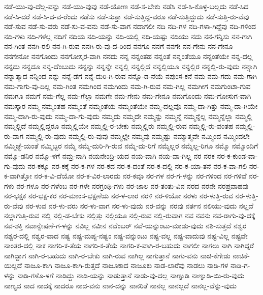 {ನಡೆ-ಯು-ವು-ದೆಲ್ಲ-ವನ್ನು
ನಡೆ-ಯು-ವುವು
ನಡೆ-ಯೋಣ
ನಡೆ-ಸ-ಬೇಕು
ನಡೆಸಿ
ನಡೆ-ಸಿ-ಕೊಳ್ಳ-ಬಲ್ಲದು
ನಡೆ-ಸಿದ
ನಡೆ-ಸಿ-ದರೆ
ನಡೆ-ಸಿ-ದ-ವ-ರೆಂದು
ನಡೆಸು
ನಡೆ-ಸುತ್ತಾ
ನಡೆ-ಸುತ್ತಿದ್ದ-ವರೂ
ನಡೆ-ಸುತ್ತಿದ್ದುದು
ನಡೆ-ಸುತ್ತಿ-ರು-ವೆವು
ನಡೆ-ಸುವ
ನಡೆ-ಸು-ವರು
ನಡೆ-ಸು-ವ-ವನು
ನಡೆ-ಸು-ವಾಗ
ನದಾಗಲೀ
ನದಿ
ನದಿ-ಗಳ
ನದಿ-ಗಳಾ-ಗಿದ್ದೆವು
ನದಿ-ಗಳಿಂದ
ನದಿ-ಗಳು
ನದಿ-ಗಳೆಲ್ಲ
ನದಿಗೆ
ನದಿಯ
ನದಿ-ಯನ್ನು
ನದಿ-ಯಲ್ಲಿ
ನದಿ-ಯಷ್ಟು
ನದಿಯು
ನದು
ನನ-ಗನ್ನಿಸು
ನನ-ಗಾಗಿ
ನನ-ಗಿಂತ
ನನಗಿ-ರಲಿ
ನನ-ಗಿ-ರುವ
ನನಗಿ-ರು-ವು-ದ-ರಿಂದ
ನನಗೂ
ನನಗೆ
ನನಗೇ
ನನ-ಗೇನು
ನನ-ಗೇನೂ
ನನಗೇನೋ
ನನಗೊಂದು
ನನಗೋಸ್ಕರ-ವಾಗಿ
ನನದು
ನನ್ನ
ನನ್ನಂತಹ
ನನ್ನಂತೆ
ನನ್ನಂತೆಯೂ
ನನ್ನಂತೆಯೇ
ನನ್ನ-ದಲ್ಲ
ನನ್ನದು
ನನ್ನದೂ
ನನ್ನ-ದೆಂಬುದು
ನನ್ನನ್ನು
ನನ್ನನ್ನೇ
ನನ್ನಲ್ಲಿ
ನನ್ನಲ್ಲಿದೆ
ನನ್ನಲ್ಲಿಯೂ
ನನ್ನಲ್ಲಿರ
ನನ್ನಲ್ಲಿ-ರು-ವುದು
ನನ್ನಾಗಿ
ನನ್ನಾತ್ಮಾದ
ನನ್ನಿಂದ
ನನ್ನು
ನನ್ನೆ-ಡೆಗೆ
ನನ್ನೆ-ದುರಿ-ಗಿ-ರುವ
ನನ್ನೊ-ಡ-ನೆಯೆ
ನಪುಂಸ-ಕನೆ
ನಮ
ನಮ-ಗದು
ನಮ-ಗಾಗಿ
ನಮ-ಗಾಗು-ವು-ದಿಲ್ಲ
ನಮ-ಗಿಂತ
ನಮಗಿಂದ
ನಮಗಿಂದು
ನಮ-ಗಿ-ರುವ
ನಮ-ಗಿಲ್ಲ
ನಮಗೀಗ
ನಮಗುಂಟಾ-ಗುವ
ನಮಗೂ
ನಮಗೆ
ನಮ-ಗೆಲ್ಲ
ನಮ-ಗೆಲ್ಲಾ
ನಮಗೇ
ನಮ-ಗೇನು
ನಮ-ಗೇನೂ
ನಮಗೊಂದು
ನಮ-ಗೋಸುಗ-ವಾಗಿ
ನಮಸ್ಕಾರ
ನಮ್ಮ
ನಮ್ಮಂತಹ
ನಮ್ಮಂತೆ
ನಮ್ಮಂತೆಯೆ
ನಮ್ಮಂತೆಯೇ
ನಮ್ಮ-ದಲ್ಲವೊ
ನಮ್ಮ-ದಾ-ಗಿತ್ತು
ನಮ್ಮ-ದಾ-ಗಿಯೇ
ನಮ್ಮ-ದಾಗಿ-ರು-ವುದು
ನಮ್ಮ-ದಾ-ಗು-ವುದು
ನಮ್ಮದು
ನಮ್ಮದೇ
ನಮ್ಮನ್ನು
ನಮ್ಮನ್ನೆ
ನಮ್ಮನ್ನೆಲ್ಲ
ನಮ್ಮನ್ನೆಲ್ಲಾ
ನಮ್ಮಲ್ಲಿ
ನಮ್ಮಲ್ಲಿದೆ
ನಮ್ಮಲ್ಲಿದ್ದರೂ
ನಮ್ಮಲ್ಲಿಯೇ
ನಮ್ಮಲ್ಲಿ-ರ-ಬೇಕು
ನಮ್ಮಲ್ಲಿರು
ನಮ್ಮಲ್ಲಿ-ರುವ
ನಮ್ಮಲ್ಲಿ-ರು-ವಂತಹ
ನಮ್ಮಲ್ಲಿ-ರು-ವಾಗ
ನಮ್ಮಲ್ಲಿ-ರು-ವುದು
ನಮ್ಮಲ್ಲಿ-ರು-ವುವು
ನಮ್ಮಲ್ಲೇ
ನಮ್ಮವು
ನಮ್ಮಷ್ಟು
ನಮ್ಮಾತ್ಮವೇ
ನಮ್ಮಿಂದ
ನಮ್ಮಿಂದಲೇ
ನಮ್ಮಿಚ್ಛೆ-ಯಂತೆ
ನಮ್ಮಿಬ್ಬರ
ನಮ್ಮೆ
ನಮ್ಮೆ-ದುರಿ-ಗಿ-ರುವ
ನಮ್ಮೆ-ದು-ರಿಗೆ
ನಮ್ಮೆಲ್ಲರ
ನಮ್ಮೆಲ್ಲ-ರಿಗೂ
ನಮ್ಮೊ
ನಮ್ಮೊಂದಿಗೆ
ನಮ್ಮೊ-ಡನಿರ
ನಮ್ಮೊ-ಳಗೆ
ನಮ್ರ-ನಾಗಿ
ನಯನೇಂದ್ರಿ-ಯದ
ನಯ-ವಾಗಿ
ನಯ-ವಾ-ಗಿಲ್ಲ
ನರ
ನರಕ
ನರ-ಕ-ಕುಂಡ-ವಾ-ಗು-ವುದು
ನರ-ಕಕ್ಕೂ
ನರ-ಕಕ್ಕೆ
ನರ-ಕ-ಗಳ
ನರ-ಕದ
ನರ-ಕ-ದಂತೆ
ನರ-ಕ-ದಲ್ಲಿ
ನರ-ಕ-ಯಾ-ತನೆ
ನರ-ಕ-ವಾ-ಗಲಿ
ನರ-ಕ-ವಾಗಿತ್ತೋ
ನರ-ಕ-ವಿ-ದೆಯೋ
ನರ-ಕ-ವಿರ-ಲಾರದು
ನರ-ಕವೂ
ನರ-ಗಳ
ನರ-ಗ-ಳನ್ನು
ನರ-ಗಳಿಂದ
ನರ-ಗಳಿವೆ
ನರ-ಗಳು
ನರ-ಗಳೂ
ನರ-ಗಳೆಂಬ
ನರ-ಗಳೇ
ನರಗ್ರಂಥಿ-ಗಳು
ನರ-ಜಾಲ
ನರ-ತಂತು-ವಿನ
ನರದ
ನರನೇ
ನರಪ್ರವಾಹವು
ನರ-ಭಕ್ಷಕ
ನರ-ಭಕ್ಷ-ಕರ
ನರ-ಮಾಂಸ-ಭಕ್ಷಣೆಯ
ನರ-ಳ-ಲಾರ
ನರಳಿ
ನರ-ಳಿಯೋ
ನರಳು
ನರ-ಳುತ್ತಿ-ರುವ
ನರ-ಳುತ್ತಿ-ರು-ವೆವು
ನರ-ಳುವ
ನರ-ಳು-ವರು
ನರ-ಳು-ವಾಗ
ನರ-ಳು-ವುದು
ನರ-ವನ್ನು
ನರವು
ನರ್ತನ
ನಲಿಯು-ವುದು
ನಲ್ಲದೆ
ನಲ್ಲಾಗುತ್ತಿ-ರುವ
ನಲ್ಲಿ
ನಲ್ಲಿ-ಡ-ಬೇಕು
ನಲ್ಲಿತ್ತು
ನಲ್ಲಿಯೂ
ನಲ್ಲಿ-ರುವ
ನಲ್ಲಿ-ರುವಾಗ
ನವ
ನವನು
ನವ-ರಾಗು-ವು-ದಕ್ಕೆ
ನವ-ಶಕ್ತಿ
ನವಾನ್ವೇಷಣೆ-ಗ-ಳನ್ನು
ನವಿಲ್ಲ
ನವೀನ
ನವೆಂಬರ್
ನವೆ-ಯನ್ನುಂಟು-ಮಾಡು-ವುದು
ನಶಿ-ಸುತ್ತದೆ
ನಶ್ವರ
ನಶ್ವರ-ದಲ್ಲಿ
ನಶ್ವರ-ವಾದ
ನಷ್ಟ
ನಷ್ಟ-ಮಪ್ಯ-ನಷ್ಟಂ
ನಷ್ಟ-ವನ್ನುಂಟು
ನಷ್ಟ-ವಲ್ಲ
ನಷ್ಟ-ವಾದುವು
ನಷ್ಟ-ವಿಲ್ಲ
ನಷ್ಟವೇ
ನಾಂತರ-ದಲ್ಲಿ
ನಾಕ
ನಾಗರಿ-ಕ-ತೆಯ
ನಾಗರಿ-ಕ-ತೆಯೆ
ನಾಗರಿ-ಕ-ವಾಗಿ-ರ-ಬಹುದು
ನಾಗಲೀ
ನಾಗಲು
ನಾಗಿ
ನಾಗಿದ್ದರೆ
ನಾಗಿದ್ದಾಗ
ನಾಗಿ-ರ-ಬಹುದು
ನಾಗಿ-ರ-ಬೇಕು
ನಾಗಿ-ರುವ
ನಾಗಿಲ್ಲ
ನಾಗುತ್ತಾನೆ
ನಾಗು-ವನು
ನಾಚಿ-ಕೆಗೇಡು
ನಾಚಿಕೆ-ಯಿಲ್ಲದೆ
ನಾಜೂ-ಕಾಗಿ
ನಾಜೂ-ಕಾಗಿ-ರುತ್ತದೆ
ನಾಜೂಕಾದ
ನಾಜೂಕು
ನಾಡ-ಲಾರೆವು
ನಾಡಲು
ನಾಡಿ-ಗಳ
ನಾಡಿ-ಗ-ಳನ್ನು
ನಾಡಿ-ಗಳೊ-ಳಗೆ
ನಾಡಿದ್ದು
ನಾಡಿ-ಯನ್ನು
ನಾಡುತ್ತಾನೆ
ನಾಡು-ವು-ದಲ್ಲ
ನಾಣ್ನುಡಿ
ನಾಣ್ನುಡಿ-ಯಿ-ರು-ವುದು
ನಾಣ್ಯದ
ನಾದ
ನಾದಕ್ಕೆ
ನಾದರೂ
ನಾದ-ವನು
ನಾನ-ದನ್ನು
ನಾನರಿತೆ
ನಾನಲ್ಲ
ನಾನಲ್ಲದೆ
ನಾನಲ್ಲ-ವೆನ್ನು-ವುದು
}
